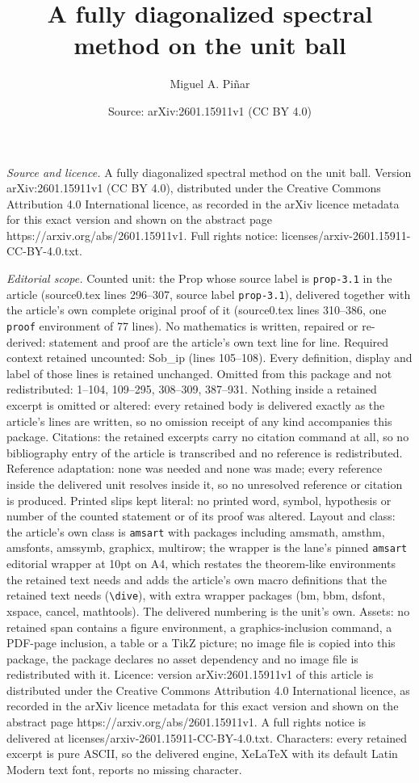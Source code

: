 \documentclass[10pt,a4paper]{amsart}
\title[A fully diagonalized spectral method on the unit ball]{A fully diagonalized spectral method on the unit ball}
\author{Miguel A. Pi\~nar}
\date{Source: arXiv:2601.15911v1 (CC BY 4.0)}
\begin{document}
\maketitle

\noindent\emph{Source and licence.} A fully diagonalized spectral method on the unit ball. Version arXiv:2601.15911v1 (CC BY 4.0), distributed under the Creative Commons Attribution 4.0 International licence, as recorded in the arXiv licence metadata for this exact version and shown on the abstract page https://arxiv.org/abs/2601.15911v1. Full rights notice: licenses/arxiv-2601.15911-CC-BY-4.0.txt.\par\smallskip

\noindent\textit{Editorial scope.} Counted unit: the Prop whose source label is \texttt{prop-3.1} in the article (source0.tex lines 296--307, source label \texttt{prop-3.1}), delivered together with the article's own complete original proof of it (source0.tex lines 310--386, one \texttt{proof} environment of 77 lines). No mathematics is written, repaired or re-derived: statement and proof are the article's own text line for line. Required context retained uncounted: Sob\_ip (lines 105--108). Every definition, display and label of those lines is retained unchanged. Omitted from this package and not redistributed: 1--104, 109--295, 308--309, 387--931. Nothing inside a retained excerpt is omitted or altered: every retained body is delivered exactly as the article's lines are written, so no omission receipt of any kind accompanies this package. Citations: the retained excerpts carry no citation command at all, so no bibliography entry of the article is transcribed and no reference is redistributed. Reference adaptation: none was needed and none was made; every reference inside the delivered unit resolves inside it, so no unresolved reference or citation is produced. Printed slips kept literal: no printed word, symbol, hypothesis or number of the counted statement or of its proof was altered. Layout and class: the article's own class is \texttt{amsart} with packages including amsmath, amsthm, amsfonts, amssymb, graphicx, multirow; the wrapper is the lane's pinned \texttt{amsart} editorial wrapper at 10pt on A4, which restates the theorem-like environments the retained text needs and adds the article's own macro definitions that the retained text needs (\texttt{\textbackslash dive}), with extra wrapper packages (bm, bbm, dsfont, xspace, cancel, mathtools). The delivered numbering is the unit's own. Assets: no retained span contains a figure environment, a graphics-inclusion command, a PDF-page inclusion, a table or a TikZ picture; no image file is copied into this package, the package declares no asset dependency and no image file is redistributed with it. Licence: version arXiv:2601.15911v1 of this article is distributed under the Creative Commons Attribution 4.0 International licence, as recorded in the arXiv licence metadata for this exact version and shown on the abstract page https://arxiv.org/abs/2601.15911v1. A full rights notice is delivered at licenses/arxiv-2601.15911-CC-BY-4.0.txt. Characters: every retained excerpt is pure ASCII, so the delivered engine, XeLaTeX with its default Latin Modern text font, reports no missing character.
\end{document}
